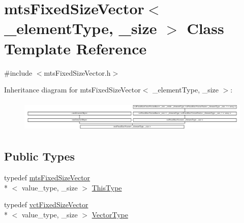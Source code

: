 \hypertarget{classmts_fixed_size_vector}{\section{mts\-Fixed\-Size\-Vector$<$ \-\_\-element\-Type, \-\_\-size $>$ Class Template Reference}
\label{classmts_fixed_size_vector}
}


{\ttfamily \#include $<$mts\-Fixed\-Size\-Vector.\-h$>$}

Inheritance diagram for mts\-Fixed\-Size\-Vector$<$ \-\_\-element\-Type, \-\_\-size $>$\-:\begin{figure}[H]
\begin{center}
\leavevmode
\includegraphics[height=1.555556cm]{da/dfc/classmts_fixed_size_vector}
\end{center}
\end{figure}
\subsection*{Public Types}
\begin{DoxyCompactItemize}
\item 
typedef \hyperlink{classmts_fixed_size_vector}{mts\-Fixed\-Size\-Vector}\\*
$<$ value\-\_\-type, \-\_\-size $>$ \hyperlink{classmts_fixed_size_vector_afdc3f321836a8df42be6bed595148de7}{This\-Type}
\item 
typedef \hyperlink{classvct_fixed_size_vector}{vct\-Fixed\-Size\-Vector}\\*
$<$ value\-\_\-type, \-\_\-size $>$ \hyperlink{classmts_fixed_size_vector_ac5c774708b6dab6c0fe332c5fcd2c5ad}{Vector\-Type}
\end{DoxyCompactItemize}

